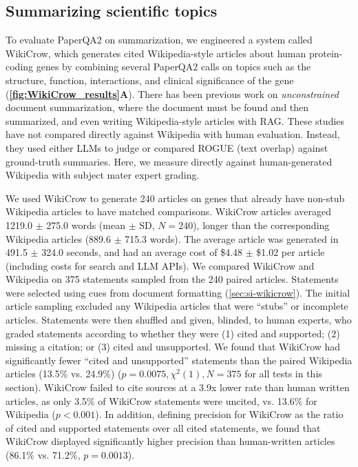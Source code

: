 \documentclass{article}
\begin{document}
\begin{bibunit}[unsrt]
\section{Summarizing scientific topics} \label{sec:wikicrow}

To evaluate PaperQA2 on summarization, we engineered a system called WikiCrow, which generates cited Wikipedia-style articles about human protein-coding genes by combining several PaperQA2 calls on topics such as the structure, function, interactions, and clinical significance of the gene (\textbf{\autoref{fig:WikiCrow_results}A}). There has been previous work on \textit{unconstrained} document summarization, where the document must be found and then summarized,\cite{Giorgi2022ExploringTC} and even writing Wikipedia-style articles with RAG\cite{shao2024assisting}. These studies have not compared directly against Wikipedia with human evaluation. Instead, they used either LLMs to judge or compared ROGUE (text overlap) against ground-truth summaries. Here, we measure directly against human-generated Wikipedia with subject mater expert grading.

We used WikiCrow to generate 240 articles on genes that already have non-stub Wikipedia articles to have matched comparisons. WikiCrow articles averaged 1219.0 $\pm$ 275.0 words (mean $\pm$ SD, $N=240$), longer than the corresponding Wikipedia articles (889.6 $\pm$ 715.3 words). The average article was generated in 491.5 $\pm$ 324.0 seconds, and had an average cost of \$4.48 $\pm$ \$1.02 per article (including costs for search and LLM APIs). We compared WikiCrow and Wikipedia on 375 statements sampled from the 240 paired articles. Statements were selected using cues from document formatting (\autoref{sec:si-wikicrow}). The initial article sampling excluded any Wikipedia articles that were ``stubs'' or incomplete articles. Statements were then shuffled and given, blinded, to human experts, who graded statements according to whether they were (1) cited and supported; (2) missing a citation; or (3) cited and unsupported. We found that WikiCrow had significantly fewer ``cited and unsupported'' statements than the paired Wikipedia articles (13.5\% vs. 24.9\%) ($p=0.0075, \chi^2(1), N=375$ for all tests in this section). WikiCrow failed to cite sources at a 3.9x lower rate than human written articles, as only 3.5\% of WikiCrow statements were uncited, vs. 13.6\% for Wikipedia ($p < 0.001$). In addition, defining precision for WikiCrow as the ratio of cited and supported statements over all cited statements, we found that WikiCrow displayed significantly higher precision than human-written articles (86.1\% vs. 71.2\%, $p = 0.0013$).


\end{bibunit}
\end{document}

